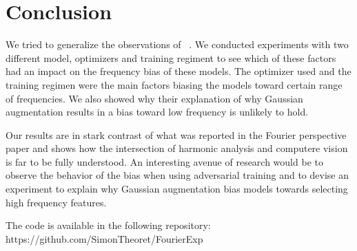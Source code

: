 \documentclass{article} \author{Simon Théorêt}
\begin{document}
\section{Conclusion}
We tried to generalize the observations of ~\citep{yin2020fourier}.
We conducted experiments with two different model, optimizers and
training regiment to see which of these factors had an impact on the
frequency bias of these models. The optimizer used and the training
regimen were the main factors biasing the models toward certain range
of frequencies. We also showed why their explanation of why Gaussian
augmentation results in a bias toward low frequency is unlikely to
hold.

Our results are in stark contrast of what was reported in the Fourier
perspective paper and shows how the intersection of harmonic analysis
and computere vision is far to be fully understood. An interesting
avenue of research would be to observe the behavior of the bias when
using adversarial training and to devise an experiment to explain why
Gaussian augmentation bias models towards selecting high frequency
features.

The code is available in the following repository: https://github.com/SimonTheoret/FourierExp



\end{document}
